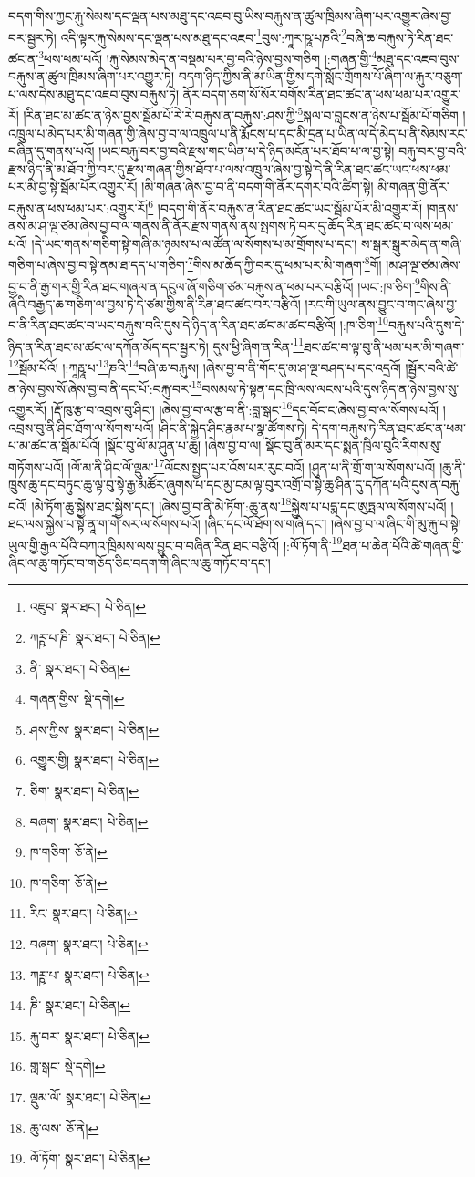 བདག་གིས་ཀྱང་རྐུ་སེམས་དང་ལྡན་པས་མཐུ་དང་འཇབ་བུ་ཡིས་བརྐུས་ན་ཚུལ་ཁྲིམས་ཞིག་པར་འགྱུར་ཞེས་བྱ་བར་སྦྱར་ཏེ། འདི་ལྟར་རྐུ་སེམས་དང་ལྡན་པས་མཐུ་དང་འཇབ་\footnote{འཇུབ་  སྣར་ཐང་།  པེ་ཅིན། }བུས་:ཀཱར་ཥཱ་པཎའི་\footnote{ཀཪྵ་པ་ཎི་  སྣར་ཐང་།  པེ་ཅིན། }བཞི་ཆ་བརྐུས་ཏེ་རིན་ཐང་ཚང་ན་\footnote{ནི་  སྣར་ཐང་།  པེ་ཅིན། }ཕས་ཕམ་པའོ། །རྐུ་སེམས་མེད་ན་བསྡམ་པར་བྱ་བའི་ཉེས་བྱས་གཅིག །:གཞན་གྱི་\footnote{གཞན་གྱིས་  སྡེ་དགེ། }མཐུ་དང་འཇབ་བུས་བརྐུས་ན་ཚུལ་ཁྲིམས་ཞིག་པར་འགྱུར་ཏེ། བདག་ཉིད་ཀྱིས་ནི་མ་ཡིན་གྱིས་དགེ་སློང་གྲོགས་པོ་ཞིག་ལ་རྐུར་བཅུག་པ་ལས་དེས་མཐུ་དང་འཇབ་བུས་བརྐུས་ཏེ། ནོར་བདག་ཅག་སོ་སོར་བགོས་རིན་ཐང་ཚང་ན་ཕས་ཕམ་པར་འགྱུར་རོ། །རིན་ཐང་མ་ཚང་ན་ཉེས་བྱས་སྦོམ་པོ་རེ་རེ་བརྐུས་ན་བརྐུས་:ཤས་ཀྱི་\footnote{ཤས་ཀྱིས་  སྣར་ཐང་།  པེ་ཅིན། }སྐལ་བ་བླངས་ན་ཉེས་པ་སྦོམ་པོ་གཅིག །འཁྲུལ་པ་མེད་པར་མི་གཞན་གྱི་ཞེས་བྱ་བ་ལ་འཁྲུལ་པ་ནི་རྨོངས་པ་དང་མི་དྲན་པ་ཡིན་ལ་དེ་མེད་པ་ནི་སེམས་རང་བཞིན་དུ་གནས་པའོ། །ཡང་བརྐུ་བར་བྱ་བའི་རྫས་གང་ཡིན་པ་དེ་ཉིད་མངོན་པར་ཐོབ་པ་ལ་བྱ་སྟེ། བརྐུ་བར་བྱ་བའི་རྫས་ཉིད་ནི་མ་ཐོབ་ཀྱི་བར་དུ་རྫས་གཞན་གྱིས་ཐོབ་པ་ལས་འཁྲུལ་ཞེས་བྱ་སྟེ་དེ་ནི་རིན་ཐང་ཚང་ཡང་ཕས་ཕམ་པར་མི་བྱ་སྟེ་སྦོམ་པོར་འགྱུར་རོ། །མི་གཞན་ཞེས་བྱ་བ་ནི་བདག་གི་ནོར་དགར་བའི་ཚིག་སྟེ། མི་གཞན་གྱི་ནོར་བརྐུས་ན་ཕས་ཕམ་པར་:འགྱུར་རོ།\footnote{འགྱུར་གྱི།  སྣར་ཐང་།  པེ་ཅིན། } །བདག་གི་ནོར་བརྐུས་ན་རིན་ཐང་ཚང་ཡང་སྦོམ་པོར་མི་འགྱུར་རོ། །གནས་ནས་མ་ཤ་ལྔ་ཙམ་ཞེས་བྱ་བ་ལ་གནས་ནི་ནོར་རྫས་གནས་ནས་སྤགས་ཏེ་བར་དུ་ཆོད་རིན་ཐང་ཚང་བ་ལས་ཕམ་པའོ། །དེ་ཡང་གནས་གཅིག་སྟེ་གཞི་མ་ཉམས་པ་ལ་ཚོན་ལ་སོགས་པ་མ་གྲོགས་པ་དང་། ས་སྒར་སྒུར་མེད་ན་གཞི་གཅིག་པ་ཞེས་བྱ་བ་སྟེ་ནམ་ཐ་དད་པ་གཅིག་\footnote{ཅིག་  སྣར་ཐང་།  པེ་ཅིན། }གིས་མ་ཆོད་ཀྱི་བར་དུ་ཕམ་པར་མི་གཞག་\footnote{བཞག་  སྣར་ཐང་།  པེ་ཅིན། }གོ། །མ་ཤ་ལྔ་ཙམ་ཞེས་བྱ་བ་ནི་རྒྱ་གར་གྱི་རིན་ཐང་གཞལ་ན་དངུལ་ཞོ་གཅིག་ཙམ་བརྐུས་ན་ཕམ་པར་བརྩིའོ། །ཡང་:ཁ་ཅིག་\footnote{ཁ་གཅིག་  ཅོ་ནེ། }གིས་ནི་ཞོའི་བརྒྱད་ཆ་གཅིག་ལ་བྱས་ཏེ་དེ་ཙམ་གྱིས་ནི་རིན་ཐང་ཚང་བར་བརྩིའོ། །རང་གི་ཡུལ་ནས་བྱུང་བ་གང་ཞེས་བྱ་བ་ནི་རིན་ཐང་ཚང་བ་ཡང་བརྐུས་བའི་དུས་དེ་ཉིད་ན་རིན་ཐང་ཚང་མ་ཚང་བརྩིའོ། །:ཁ་ཅིག་\footnote{ཁ་གཅིག་  ཅོ་ནེ། }བརྐུས་པའི་དུས་དེ་ཉིད་ན་རིན་ཐང་མ་ཚང་ལ་དཀོན་མོད་དང་སྦྱར་ཏེ། དུས་ཕྱི་ཞིག་ན་རིན་\footnote{རིང་  སྣར་ཐང་།  པེ་ཅིན། }ཐང་ཚང་བ་ལྟ་བུ་ནི་ཕམ་པར་མི་གཞག་\footnote{བཞག་  སྣར་ཐང་།  པེ་ཅིན། }སྦོམ་པོའོ། །:ཀཱརྵཱ་པ་\footnote{ཀཪྵ་པ་  སྣར་ཐང་།  པེ་ཅིན། }ཎའི་\footnote{ཎི་  སྣར་ཐང་།  པེ་ཅིན། }བཞི་ཆ་བརྐུས། །ཞེས་བྱ་བ་ནི་གོང་དུ་མ་ཤ་ལྔ་བཤད་པ་དང་འདྲའོ། །སྦྱོར་བའི་ཚེ་ན་ཉེས་བྱས་སོ་ཞེས་བྱ་བ་ནི་དང་པོ་:བརྐུ་བར་\footnote{རྐུ་བར་  སྣར་ཐང་།  པེ་ཅིན། }བསམས་ཏེ་སྟན་དང་ཁྲི་ལས་ལངས་པའི་དུས་ཉིད་ན་ཉེས་བྱས་སུ་འགྱུར་རོ། །རྡོ་ཁུ་རྩ་བ་འབྲས་བུ་ཤིང་། །ཞེས་བྱ་བ་ལ་རྩ་བ་ནི་:བླ་སྒང་\footnote{གླ་སྒང་  སྡེ་དགེ། }དང་བོང་ང་ཞེས་བྱ་བ་ལ་སོགས་པའོ། །འབྲས་བུ་ནི་ཤིང་ཐོག་ལ་སོགས་པའོ། །ཤིང་ནི་སྐྱེད་ཤིང་རྣམ་པ་སྣ་ཚོགས་ཏེ། དེ་དག་བརྐུས་ཏེ་རིན་ཐང་ཚང་ན་ཕམ་པ་མ་ཚང་ན་སྦོམ་པོའོ། །སྡོང་བུ་ལོ་མ་ཤུན་པ་ཆུ། །ཞེས་བྱ་བ་ལ། སྡོང་བུ་ནི་མར་དང་སྨན་ཁྲིལ་བུའི་རིགས་སུ་གཏོགས་པའོ། །ལོ་མ་ནི་ཤིང་ལོ་ལྡུམ་\footnote{ལྡུམ་ལོ་  སྣར་ཐང་།  པེ་ཅིན། }ལོངས་སྤྱད་པར་འོས་པར་རུང་བའོ། །ཤུན་པ་ནི་གྲོ་ག་ལ་སོགས་པའོ། །ཆུ་ནི་ཁྲུས་ཆུ་དང་བཏུང་ཆུ་ལྟ་བུ་སྟེ་རྒྱ་མཚོར་ཞུགས་པ་དང་མྱ་ངམ་ལྟ་བུར་འགྲོ་བ་སྟེ་ཆུ་ཤིན་དུ་དཀོན་པའི་དུས་ན་བརྐུ་བའོ། །མེ་ཏོག་ཆུ་སྐྱེས་ཐང་སྐྱེས་དང་། །ཞེས་བྱ་བ་ནི་མེ་ཏོག་:ཆུ་ནས་\footnote{ཆུ་ལས་  ཅོ་ནེ། }སྐྱེས་པ་པདྨ་དང་ཨུཏྤལ་ལ་སོགས་པའོ། །ཐང་ལས་སྐྱེས་པ་སྟེ་ནཱ་ག་གེ་སར་ལ་སོགས་པའོ། །ཞིང་དང་ལོ་ཐོག་ས་གཞི་དང་། །ཞེས་བྱ་བ་ལ་ཞིང་གི་མུ་རྐུ་བ་སྟེ། ཡུལ་གྱི་རྒྱལ་པོའི་བཀའ་ཁྲིམས་ལས་བྱུང་བ་བཞིན་རིན་ཐང་བརྩིའོ། །:ལོ་ཏོག་ནི་\footnote{ལོ་ཏོག་  སྣར་ཐང་།  པེ་ཅིན། }ཐན་པ་ཆེན་པོའི་ཚེ་གཞན་གྱི་ཞིང་ལ་ཆུ་གཏོང་བ་གཅོད་ཅིང་བདག་གི་ཞིང་ལ་ཆུ་གཏོང་བ་དང་། 